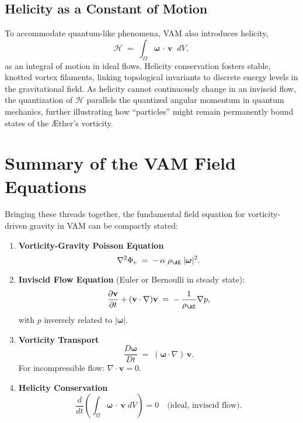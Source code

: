 \documentclass[aps,preprint,superscriptaddress]{revtex4-2}
\begin{document}
    \subsection{Helicity as a Constant of Motion}

    To accommodate quantum-like phenomena, VAM also introduces helicity,
    \[
        \mathcal{H} \;=\; \int_{\Omega} \boldsymbol{\omega} \,\cdot\, \mathbf{v} \;\;dV,
    \]
    as an integral of motion in ideal flows. Helicity conservation fosters stable, knotted vortex filaments, linking topological invariants to discrete energy levels in the gravitational field. As helicity cannot continuously change in an inviscid flow, the quantization of \(\mathcal{H}\) parallels the quantized angular momentum in quantum mechanics, further illustrating how “particles” might remain permanently bound states of the Æther’s vorticity.

    \section{Summary of the VAM Field Equations}

    Bringing these threads together, the fundamental field equation for vorticity-driven gravity in VAM can be compactly stated:

    \begin{enumerate}
        \item \textbf{Vorticity-Gravity Poisson Equation}
    \[
        \nabla^2 \Phi_v \;=\; -\,\alpha\;\rho_{\mathrm{\AE}}\;\lvert \boldsymbol{\omega} \rvert^2.
    \]

        \item \textbf{Inviscid Flow Equation} (Euler or Bernoulli in steady state):
    \[
        \frac{\partial \mathbf{v}}{\partial t} + (\mathbf{v}\cdot\nabla)\mathbf{v} \;=\; -\,\frac{1}{\rho_{\mathrm{\AE}}}\nabla p,
    \]
    with \(p\) inversely related to \(\lvert \boldsymbol{\omega} \rvert\).

        \item \textbf{Vorticity Transport}
    \[
        \frac{D \boldsymbol{\omega}}{Dt} \;=\;  (\boldsymbol{\omega} \cdot \nabla)\,\mathbf{v}.
    \]
    For incompressible flow: \(\nabla \cdot \mathbf{v} = 0\).

        \item \textbf{Helicity Conservation}
    \[
        \frac{d}{dt}  \left( \int_{\Omega} \boldsymbol{\omega}\,\cdot\,\mathbf{v}\; dV \right) = 0  \quad \text{(ideal, inviscid flow)}.
    \]
    \end{enumerate}
\end{document}
